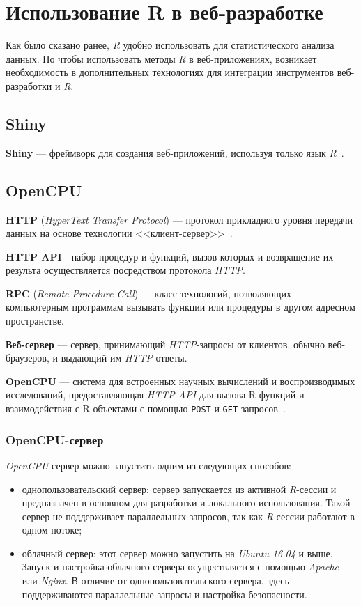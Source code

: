 \section{Использование R в веб-разработке}
Как было сказано ранее, \emph{R} удобно использовать для статистического анализа данных. Но чтобы использовать методы \emph{R} в веб-приложениях, возникает необходимость в дополнительных технологиях для интеграции инструментов веб-разработки и \emph{R}.

\subsection{Shiny}
\textbf{Shiny} --- фреймворк для создания веб-приложений, используя только язык \emph{R}~\cite{shiny}.
\subsection{OpenCPU}
\textbf{HTTP} (\emph{HyperText Transfer Protocol}) ---  протокол прикладного уровня передачи данных на основе технологии <<клиент-сервер>>~\cite{http}.

\textbf{HTTP API} - набор процедур и функций, вызов которых и возвращение их результа осуществляется посредством протокола \emph{HTTP}.

\textbf{RPC} (\emph{Remote Procedure Call}) --- класс технологий, позволяющих компьютерным программам вызывать функции или процедуры в другом адресном пространстве.

\textbf{Веб-сервер} --- сервер, принимающий \emph{HTTP}-запросы от клиентов, обычно веб-браузеров, и выдающий им \emph{HTTP}-ответы.

\textbf{OpenCPU} --- система для встроенных научных вычислений и воспроизводимых исследований, предоставляющая \emph{HTTP API} для вызова R-функций и взаимодействия с R-объектами с помощью \texttt{POST} и \texttt{GET} запросов~\cite{opencpu}.

\subsubsection{OpenCPU-сервер}\label{opencpuintro}
\emph{OpenCPU}-сервер можно запустить одним из следующих способов:
\begin{itemize}
\item однопользовательский сервер: сервер запускается из активной \emph{R}-сессии и предназначен в основном для разработки и локального использования. Такой сервер не поддерживает параллельных запросов, так как \emph{R}-сессии работают в одном потоке;
\item облачный сервер: этот сервер можно запустить на \emph{Ubuntu 16.04} и выше. Запуск и настройка облачного сервера осуществляется с помощью \emph{Apache} или \emph{Nginx}. В отличие от однопользовательского сервера, здесь поддерживаются параллельные запросы и настройка безопасности.
\end{itemize}

